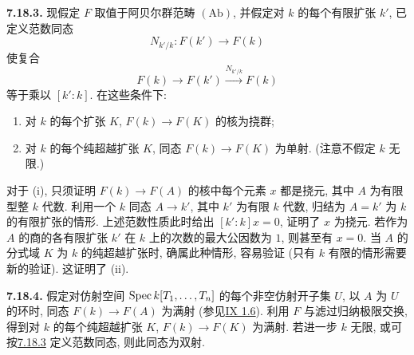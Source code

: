 \textbf{7.18.3.} 现假定 $F$ 取值于阿贝尔群范畴 $(\mathrm{Ab})$, 并假定对 $k$ 的每个有限扩张 $k'$, 已定义范数同态
%
%
%
\[
N_{k'/k}:F(k')\longrightarrow F(k)
\]
使复合
\[
F(k)\longrightarrow F(k')\xrightarrow{N_{k'/k}}F(k)
\]
等于乘以 $[k':k]$. 在这些条件下:
\begin{enumerate}[label=(\roman*)]
\item 对 $k$ 的每个扩张 $K$, $F(k)\to F(K)$ 的核为挠群; \item 对 $k$ 的每个纯超越扩张 $K$, 同态 $F(k)\to F(K)$ 为单射. (注意不假定 $k$ 无限.)
%
%
%
\end{enumerate}

对于 (i), 只须证明 $F(k)\to F(A)$ 的核中每个元素 $x$ 都是挠元, 其中 $A$ 为有限型整 $k$ 代数. 利用一个 $k$ 同态 $A\to k'$, 其中 $k'$ 为有限 $k$ 代数, 归结为 $A=k'$ 为 $k$ 的有限扩张的情形. 上述范数性质此时给出 $[k':k]x=0$, 证明了 $x$ 为挠元. 若作为 $A$ 的商的各有限扩张 $k'$ 在 $k$ 上的次数的最大公因数为 $1$, 则甚至有 $x=0$. 当 $A$ 的分式域 $K$ 为 $k$ 的纯超越扩张时, 确属此种情形, 容易验证 (只有 $k$ 有限的情形需要新的验证). 这证明了 (ii).
%
%
%
%
%
%
%
%
%

\textbf{7.18.4.} 假定对仿射空间 $\operatorname{Spec} k[T_1,\ldots,T_n]$ 的每个非空仿射开子集 $U$, 以 $A$ 为 $U$ 的环时, 同态 $F(k)\to F(A)$ 为满射 (参见\hyperlink{sga6.e09.prop.1-6}{IX 1.6}). 利用 $F$ 与滤过归纳极限交换, 得到对 $k$ 的每个纯超越扩张 $K$, $F(k)\to F(K)$ 为满射. 若进一步 $k$ 无限, 或可按\hyperlink{sga6.e10.para.7-18-3}{7.18.3} 定义范数同态, 则此同态为双射.
%
%
%
%
%
%
%


